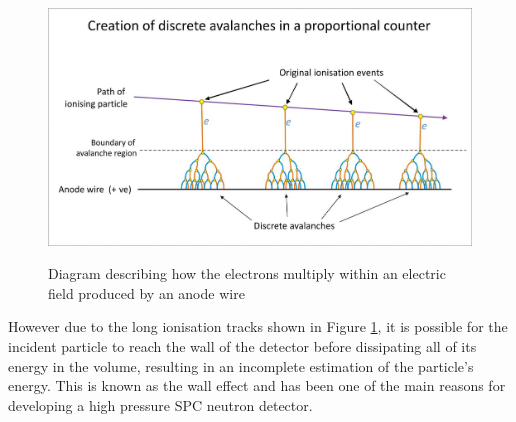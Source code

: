 \documentclass[a4paper]{article}
\begin{document}
\begin{figure}[H]
    \centering
    \includegraphics[height=7cm]{avalanches.jpg}
    \caption{Diagram describing how the electrons multiply within an electric field produced by an anode wire \cite{wikipedia_2021}}
    \label{fig:avala}
\end{figure}
\noindent However due to the long ionisation tracks shown in Figure \ref{fig:avala}, it is possible for the incident particle to reach the wall of the detector before dissipating all of its energy in the volume, resulting in an incomplete estimation of the particle's energy. This is known as the wall effect and has been one of the main reasons for developing a high pressure SPC neutron detector.
\end{document}

